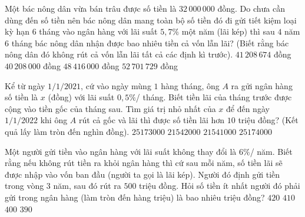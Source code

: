 \begin{ex}
	Một bác nông dân vừa bán trâu được số tiền là $32\,000\,000$ đồng. Do chưa cần dùng đến số tiền nên bác nông dân mang toàn bộ số tiền đó đi gửi tiết kiệm loại kỳ hạn $6$ tháng vào ngân hàng với lãi suất $5{,}7\%$ một năm (lãi kép) thì sau $4$ năm $6$ tháng bác nông dân nhận được bao nhiêu tiền cả vốn lẫn lãi? (Biết rằng bác nông dân đó không rút cả vốn lẫn lãi tất cả các định kì trước).
	\choice
	{\True$41\,208\,674$ đồng}
	{$40\,208\,000$ đồng}
	{$48\,416\,000$ đồng}
	{$52\,701\,729$ đồng}
\end{ex}

\begin{ex}
	Kể từ ngày $1/1/2021$, cứ vào ngày mùng $1$ hàng tháng, ông $A$ ra gửi ngân hàng số tiền là $x$ (đồng) với lãi suất $0{,}5\%$/ tháng. Biết tiền lãi của tháng trước được cộng vào tiền gốc của tháng sau. Tìm giá trị nhỏ nhất của $x$ để đến ngày $1/1/2022$ khi ông $A$ rút cả gốc và lãi thì được số tiền lãi hơn $10$ triệu đồng? (Kết quả lấy làm tròn đến nghìn đồng).	
	\choice
	{$25173000$}
	{$21542000$}
	{$21541000$}
	{\True $25174000$}
\end{ex}

\begin{ex}
Một người gửi tiền vào ngân hàng với lãi suất không thay đổi là $6\%$/ năm. Biết rằng nếu không rút tiền ra khỏi ngân hàng thì cứ sau mỗi năm, số tiền lãi sẽ được nhập vào vốn ban đầu (người ta gọi là lãi kép). Người đó định gửi tiền trong vòng $3$ năm, sau đó rút ra $500$ triệu đồng. Hỏi số tiền ít nhất người đó phải gửi trong ngân hàng (làm tròn đến hàng triệu) là bao nhiêu triệu đồng?
\choice
{\True $420$}
{$410$}
{$400$}
{$390$}
\end{ex}

